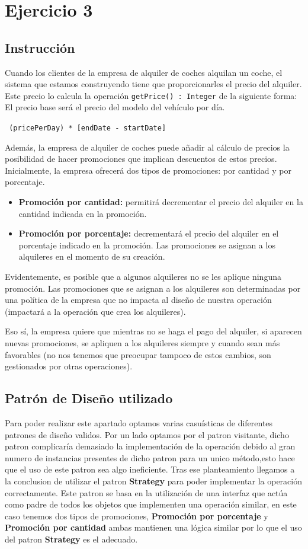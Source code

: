 \section{Ejercicio 3}
\subsection*{Instrucción}
Cuando los clientes de la empresa de alquiler de coches alquilan un coche, el sistema que estamos construyendo
tiene que proporcionarles el precio del alquiler. Este precio lo calcula la operación \texttt{getPrice() : Integer} de la siguiente
forma: El precio base será el precio del modelo del vehículo por día.
\begin{center}
    \texttt{ (pricePerDay) * [endDate - startDate]}
\end{center}
Además, la empresa de alquiler de coches puede añadir al cálculo de precios la posibilidad de hacer promociones
que implican descuentos de estos precios. Inicialmente, la empresa ofrecerá dos tipos de promociones: por cantidad
y por porcentaje.
\begin{itemize}
    \item \textbf{Promoción por cantidad:} permitirá decrementar el precio del alquiler en la cantidad indicada en
    la promoción.
    \item \textbf{Promoción por porcentaje:} decrementará el precio del alquiler en el porcentaje indicado en la
    promoción. Las promociones se asignan a los alquileres en el momento de su creación.
\end{itemize}
Evidentemente, es posible
que a algunos alquileres no se les aplique ninguna promoción. Las promociones que se asignan a los alquileres son
determinadas por una política de la empresa que no impacta al diseño de nuestra operación (impactará a la
operación que crea los alquileres).\par
\vspace{0.15cm}
Eso sí, la empresa quiere que mientras no se haga el pago del alquiler, si aparecen
nuevas promociones, se apliquen a los alquileres siempre y cuando sean más favorables (no nos tenemos que
preocupar tampoco de estos cambios, son gestionados por otras operaciones).


\subsection{Patrón de Diseño utilizado}
Para poder realizar este apartado optamos varias casuísticas de diferentes patrones de diseño validos. Por un lado optamos por el patron visitante,
dicho patron complicaría demasiado la implementación de la operación debido al gran numero de instancias presentes de dicho patron para un unico método,esto hace que 
el uso de este patron sea algo ineficiente. Tras ese planteamiento llegamos a la conclusion de utilizar el patron \textbf{Strategy} para poder implementar la operación correctamente.
Este patron se basa en la utilización de una interfaz que actúa como padre de todos los objetos que implementen una operación similar, en este caso tenemos dos tipos de promociones,
\textbf{Promoción por porcentaje} y \textbf{Promoción por cantidad} ambas mantienen una lógica similar por lo que el uso del patron \textbf{Strategy} es el adecuado.

